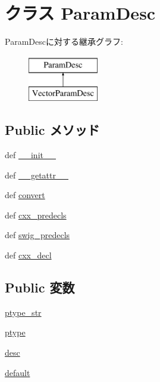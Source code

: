 \hypertarget{classm5_1_1params_1_1ParamDesc}{
\section{クラス ParamDesc}
\label{classm5_1_1params_1_1ParamDesc}
}
ParamDescに対する継承グラフ:\begin{figure}[H]
\begin{center}
\leavevmode
\includegraphics[height=2cm]{classm5_1_1params_1_1ParamDesc}
\end{center}
\end{figure}
\subsection*{Public メソッド}
\begin{DoxyCompactItemize}
\item 
def \hyperlink{classm5_1_1params_1_1ParamDesc_ac775ee34451fdfa742b318538164070e}{\_\-\_\-init\_\-\_\-}
\item 
def \hyperlink{classm5_1_1params_1_1ParamDesc_a0a990b3ec3889d40889daca9ee5e4695}{\_\-\_\-getattr\_\-\_\-}
\item 
def \hyperlink{classm5_1_1params_1_1ParamDesc_afe69e9190aa0b3889a9a5f63a42799f5}{convert}
\item 
def \hyperlink{classm5_1_1params_1_1ParamDesc_a0b408a11a14bd1d770e28f71a6e14ab5}{cxx\_\-predecls}
\item 
def \hyperlink{classm5_1_1params_1_1ParamDesc_ab3dbcf5716623eac67a8ccc074fa7e13}{swig\_\-predecls}
\item 
def \hyperlink{classm5_1_1params_1_1ParamDesc_a723cbb1dc9ae0e7f3d102c6678f181c0}{cxx\_\-decl}
\end{DoxyCompactItemize}
\subsection*{Public 変数}
\begin{DoxyCompactItemize}
\item 
\hyperlink{classm5_1_1params_1_1ParamDesc_aa8c35e996fc0b5939673a827d636950d}{ptype\_\-str}
\item 
\hyperlink{classm5_1_1params_1_1ParamDesc_a0916607956575302a93dbd21440edc1a}{ptype}
\item 
\hyperlink{classm5_1_1params_1_1ParamDesc_aafc566bb08a9f46485e7238669581c2b}{desc}
\item 
\hyperlink{classm5_1_1params_1_1ParamDesc_affb1327b18bf08a379d19eef89cf1ed1}{default}
\end{DoxyCompactItemize}


